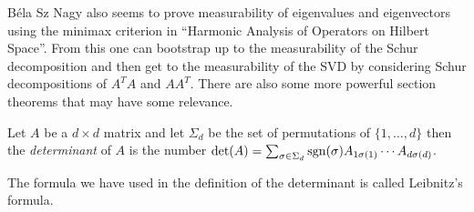 B\'{e}la Sz Nagy also seems to prove measurability of eigenvalues and eigenvectors using the minimax criterion in ``Harmonic Analysis of Operators on Hilbert Space''.  From this one can bootstrap up to the measurability of the Schur decomposition and then get to the measurability of the SVD by considering Schur decompositions of $A^TA$ and $AA^T$.  There are also some more powerful section theorems that may have some relevance.

\begin{defn}Let $A$ be a $d \times d$ matrix and let $\Sigma_d$ be the set of permutations of $\lbrace 1, \dotsc, d \rbrace$ then the \emph{determinant} of $A$ is the number $\det(A) = \sum_{\sigma \in \Sigma_d} \operatorname*{sgn}(\sigma) A_{1\sigma(1)} \dotsb A_{d \sigma(d)}$.
\end{defn}
The formula we have used in the definition of the determinant is called Leibnitz's formula.


